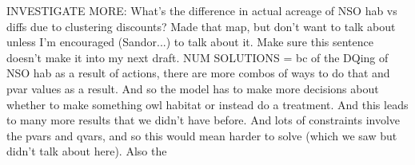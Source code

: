 INVESTIGATE MORE:
What's the difference in actual acreage of NSO hab vs diffs due to clustering discounts? Made that map, but don't want to talk about unless I'm encouraged (Sandor...) to talk about it. Make sure this sentence doesn't make it into my next draft.
NUM SOLUTIONS = bc of the DQing of NSO hab as a result of actions, there are more combos of ways to do that and pvar values as a result. And so the model has to make more decisions about whether to make something owl habitat or instead do a treatment. And this leads to many more results that we didn't have before. And lots of constraints involve the pvars and qvars, and so this would mean harder to solve (which we saw but didn't talk about here). Also the 
